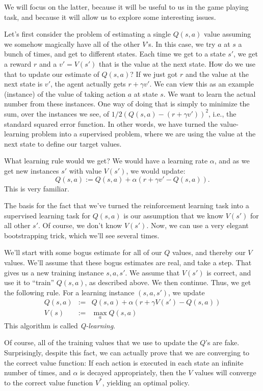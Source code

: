 We will focus on the latter, because it will be useful to us in the game
playing task, and because it will allow us to explore some interesting
issues. 

Let's first consider the problem of estimating a single $Q(s,a)$ value
assuming we somehow magically have all of the other $V$'s.  In this case, we
try $a$ at $s$ a bunch of times, and get to different states.  Each time we
get to a state $s'$, we get a reward $r$ and a $v' = V(s')$ that is the
value at the next state.  How do we use that to update our estimate
of $Q(s,a)$?  If we just got $r$ and the value at the next state is $v'$, the
agent actually gets $r + \gamma v'$.  We can view this as an example
(instance) of the value of taking action $a$ at state $s$.  We want to learn
the actual number from these instances.  One way of doing that is simply to
minimize the sum, over the instances we see, of $1/2 (Q(s,a) - (r + \gamma
v'))^2$, i.e., the standard squared error function.  In other words, we have
turned the value-learning problem into a supervised problem, where we are
using the value at the next state to define our target values.

What learning rule would we get?  We would have a learning rate $\alpha$,
and as we get new instances $s'$ with value $V(s')$, we would update:
\[
  Q(s,a) := Q(s,a) + \alpha (r + \gamma v' - Q(s,a)).
\]
This is very familiar.  

The basis for the fact that we've turned the reinforcement learning task
into a supervised learning task for $Q(s,a)$ is our assumption that we know
$V(s')$ for all other $s'$.  Of course, we don't know $V(s')$.  Now, we can
use a very elegant bootstrapping trick, which we'll see several times.

We'll start with some bogus estimate for all of our $Q$ values, and thereby
our $V$ values.  We'll assume that these bogus estimates are real, and take
a step.  That gives us a new training instance $s,a,s'$.  We assume that
$V(s')$ is correct, and use it to ``train'' $Q(s,a)$, as described above.
We then continue.  Thus, we get the following rule.  For a learning instance
$(s,a,s')$, we update 
\begin{eqnarray*}
 Q(s,a) & := & Q(s,a) + \alpha (r + \gamma V(s') - Q(s,a)) \\
 V(s)   & := & \max_a Q(s,a)
\end{eqnarray*}
This algorithm is called {\em Q-learning}.

Of course, all of the training values that we use to update the $Q$'s are fake.
Surprisingly, despite this fact, we can actually prove that we are converging
to the correct value function: 
\thm
If each action is executed in each state an infinite number of  times,
and $\alpha$ is decayed appropriately, then the $V$ values will
converge to the correct value function $V^*$, yielding an optimal policy.
\ethm


